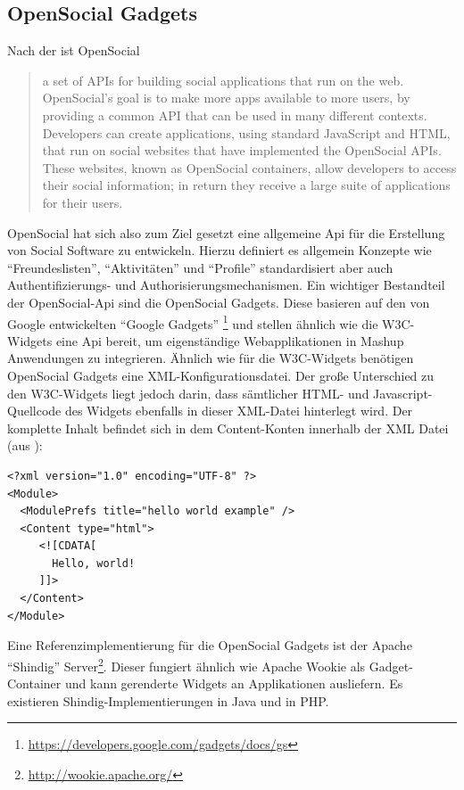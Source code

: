 \subsection{OpenSocial Gadgets}\label{section:opensocial_gadgets}
Nach der \cite{Opensocial2013} ist OpenSocial
\begin{quotation}
  a set of APIs for building social applications that run on the web. OpenSocial's goal is to make more apps available to more users, by providing a common API that can be used in many different contexts. Developers can create applications, using standard JavaScript and HTML, that run on social websites that have implemented the OpenSocial APIs. These websites, known as OpenSocial containers, allow developers to access their social information; in return they receive a large suite of applications for their users.
\end{quotation}
OpenSocial hat sich also zum Ziel gesetzt eine allgemeine Api für die Erstellung von Social Software zu entwickeln. Hierzu definiert es allgemein Konzepte wie "`Freundeslisten"', "`Aktivitäten"' und "`Profile"' standardisiert aber auch Authentifizierungs- und Authorisierungsmechanismen. Ein wichtiger Bestandteil der OpenSocial-Api sind die OpenSocial Gadgets. Diese basieren auf den von Google entwickelten "`Google Gadgets"' \footnote{\url{https://developers.google.com/gadgets/docs/gs}} und stellen ähnlich wie die W3C-Widgets eine Api bereit, um eigenständige Webapplikationen in Mashup Anwendungen zu integrieren. Ähnlich wie für die W3C-Widgets benötigen OpenSocial Gadgets eine XML-Konfigurationsdatei. Der große Unterschied zu den W3C-Widgets liegt jedoch darin, dass sämtlicher HTML- und Javascript-Quellcode des Widgets ebenfalls in dieser XML-Datei hinterlegt wird. Der komplette Inhalt befindet sich in dem Content-Konten innerhalb der XML Datei (aus \cite{GoogleGadgetsApi2012}): 
\begin{lstlisting}
<?xml version="1.0" encoding="UTF-8" ?> 
<Module>
  <ModulePrefs title="hello world example" /> 
  <Content type="html">
     <![CDATA[ 
       Hello, world!
     ]]>
  </Content> 
</Module>
\end{lstlisting}
Eine Referenzimplementierung für die OpenSocial Gadgets ist der Apache "`Shindig"' Server\footnote{\url{http://wookie.apache.org/}}. Dieser fungiert ähnlich wie Apache Wookie als Gadget-Container und kann gerenderte Widgets an Applikationen ausliefern. Es existieren Shindig-Implementierungen in Java und in PHP.

